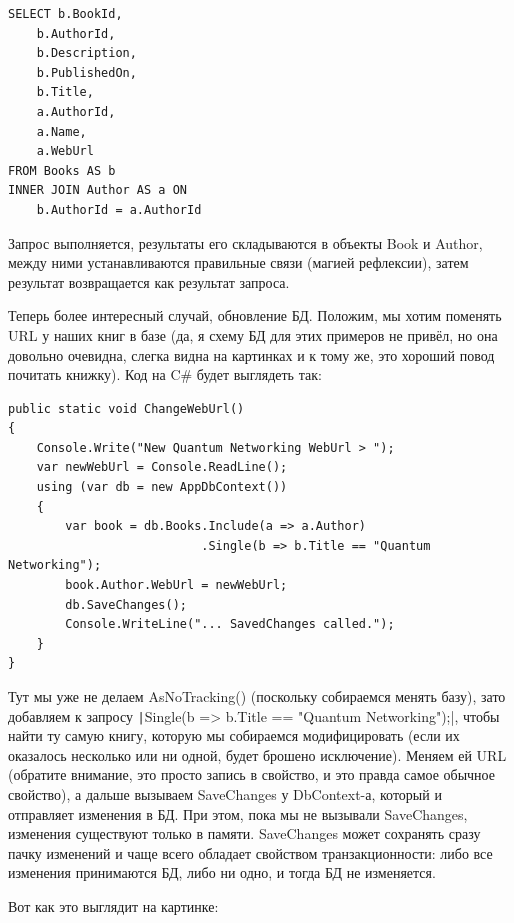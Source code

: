 \documentclass[a5paper]{article}
\begin{document}
\begin{verbatim}
SELECT b.BookId,
    b.AuthorId,
    b.Description,
    b.PublishedOn,
    b.Title,
    a.AuthorId,
    a.Name,
    a.WebUrl
FROM Books AS b
INNER JOIN Author AS a ON
    b.AuthorId = a.AuthorId
\end{verbatim}

Запрос выполняется, результаты его складываются в объекты Book и Author, между ними устанавливаются правильные связи (магией рефлексии), затем результат возвращается как результат запроса.

Теперь более интересный случай, обновление БД. Положим, мы хотим поменять URL у наших книг в базе (да, я схему БД для этих примеров не привёл, но она довольно очевидна, слегка видна на картинках и к тому же, это хороший повод почитать книжку). Код на C\# будет выглядеть так:

\begin{verbatim}
public static void ChangeWebUrl()
{
    Console.Write("New Quantum Networking WebUrl > ");
    var newWebUrl = Console.ReadLine();
    using (var db = new AppDbContext())
    {
        var book = db.Books.Include(a => a.Author)
                           .Single(b => b.Title == "Quantum Networking");
        book.Author.WebUrl = newWebUrl;
        db.SaveChanges();
        Console.WriteLine("... SavedChanges called.");
    }
}
\end{verbatim}

Тут мы уже не делаем AsNoTracking() (поскольку собираемся менять базу), зато добавляем к запросу \texttt|Single(b => b.Title == "Quantum Networking");|, чтобы найти ту самую книгу, которую мы собираемся модифицировать (если их оказалось несколько или ни одной, будет брошено исключение). Меняем ей URL (обратите внимание, это просто запись в свойство, и это правда самое обычное свойство), а дальше вызываем SaveChanges у DbContext-а, который и отправляет изменения в БД. При этом, пока мы не вызывали SaveChanges, изменения существуют только в памяти. SaveChanges может сохранять сразу пачку изменений и чаще всего обладает свойством транзакционности: либо все изменения принимаются БД, либо ни одно, и тогда БД не изменяется.

Вот как это выглядит на картинке:
\end{document}
